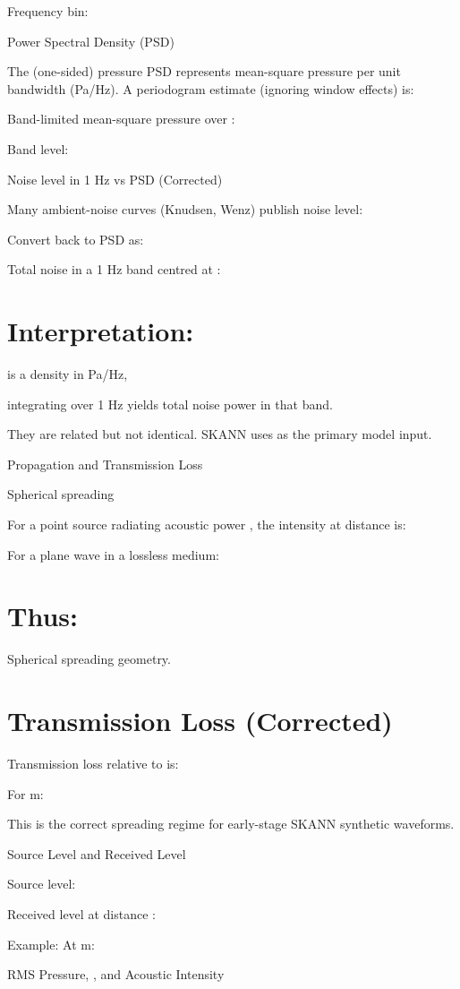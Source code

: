 \documentclass[12pt]{article}
\begin{document}
Frequency bin:


Power Spectral Density (PSD)

The (one-sided) pressure PSD  represents mean-square pressure per unit bandwidth (Pa/Hz). A periodogram estimate (ignoring window effects) is:


Band-limited mean-square pressure over :


Band level:


Noise level in 1 Hz vs PSD (Corrected)

Many ambient-noise curves (Knudsen, Wenz) publish noise level:


Convert back to PSD as:


Total noise in a 1 Hz band centred at :


\section*{Interpretation:}
is a density in Pa/Hz,

integrating over 1 Hz yields total noise power in that band.

They are related but not identical. SKANN uses  as the primary model input.

Propagation and Transmission Loss

Spherical spreading

For a point source radiating acoustic power , the intensity at distance  is:


For a plane wave in a lossless medium:


\section*{Thus:}

Spherical spreading geometry.

\section*{Transmission Loss (Corrected)}
Transmission loss relative to  is:


For  m:


This is the correct spreading regime for early-stage SKANN synthetic waveforms.

Source Level and Received Level

Source level:


Received level at distance :


Example: At  m:


RMS Pressure, , and Acoustic Intensity
\end{document}
